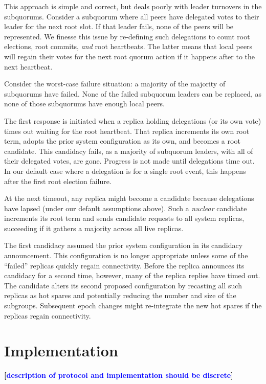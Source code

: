 \documentclass[10pt,conference]{IEEEtran}
\newcommand{\sub}{subquorum\xspace}
\newcommand{\subs}{subquorums\xspace}
\newcommand{\roo}{root quorum\xspace}
\renewcommand{\pjk}[1]{{\bf
    [\marginpar[\hbox{{\textcolor{blue}{pjk}}\raisebox{0ex}{\Huge $\rightarrow$}}]%
{\hbox{\raisebox{0ex}{\Huge $\leftarrow$}{\textcolor{blue}{pjk}}}}\textcolor{blue}{#1}]}}
\begin{document}
This approach is simple and correct, but deals poorly with leader turnovers in
the \subs.
Consider a \sub where all peers have delegated votes to their leader
for the next root slot.
If that leader fails, none of the peers will be represented.
We finesse this issue by re-defining such delegations to count
root elections, root commits, \emph{and} root heartbeats.
The latter means that local peers will regain their votes for the next \roo
action if it happens after to the next heartbeat.

Consider the worst-case failure situation: a majority of the majority of \subs have
failed.
None of the failed \sub leaders can be replaced, as none of those \subs have
enough local peers.

The first response is initiated when a replica holding delegations (or its own
vote) times out waiting for the root heartbeat.
That replica increments its own root term, adopts the prior system
configuration as its own, and becomes a root candidate.
This candidacy fails, as a majority of \sub leaders, with all of their
delegated votes, are gone.
Progress is not made until delegations time out.
In our default case where a delegation is for a single root event, this
happens after the first root election failure.

At the next timeout, any replica might become a candidate because delegations have
lapsed (under our default assumptions above).
Such a \emph{nuclear} candidate increments its root term and
sends candidate requests to all system replicas,
succeeding if it gathers a majority across all live replicas.

The first candidacy assumed the prior system configuration in its candidacy
announcement.
This configuration is no longer appropriate unless some of the ``failed''
replicas quickly regain connectivity.
Before the replica announces its candidacy for a second time, however, many of
the replica replies have timed out.
The candidate alters its second proposed configuration by recasting all such
replicas as hot spares and potentially reducing the number and size of the
subgroups.
Subsequent epoch changes might re-integrate the new hot spares if the replicas
regain connectivity.

\section{Implementation}
\label{section:implementation}

\pjk{description of protocol and implementation should be discrete}
\end{document}
